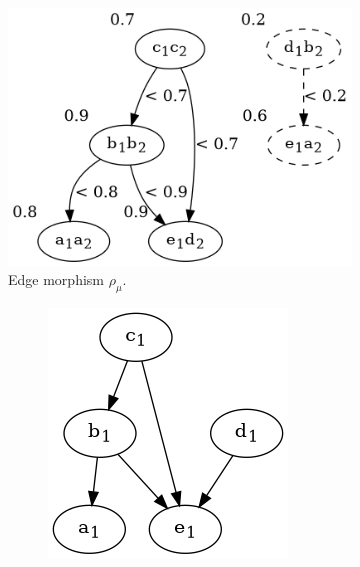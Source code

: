 \begin{frame}
\begin{figure}[htbp]
\begin{subfigure}[t]{0.40\textwidth}
			\includegraphics[width=\linewidth,valign=t]{inc/fuzzy_graph_theory/fuzzy_graph_morphism_internal_rho_mu.png}
			\caption{Edge morphism $\rho_{\mu}$.}
		\end{subfigure}
		\quad
		\begin{subfigure}[t]{0.18\textwidth}
			\begin{subfigure}[t]{\textwidth}
				\centering
				\includegraphics[width=\linewidth,valign=t]{inc/fuzzy_graph_theory/fuzzy_graph_morphism_G1.png}

\end{subfigure}
\end{subfigure}
\end{figure}
\end{frame}
